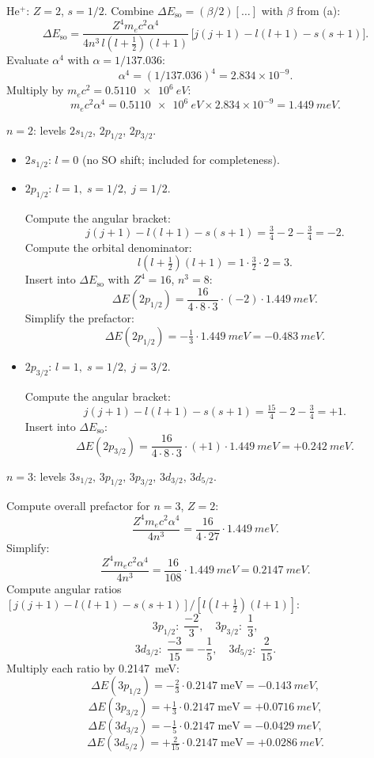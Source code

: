 \documentclass[11pt]{article}
\begin{document}
He$^+$: $Z=2$, $s=1/2$. Combine $\Delta E_{\text{so}}=(\beta/2)[\dots]$ with $\beta$ from (a):
\[
\Delta E_\text{so} = \frac{Z^4 m_e c^2\alpha^4}{4 n^3\,l(l+\tfrac12)(l+1)}\,\bigl[j(j+1)-l(l+1)-s(s+1)\bigr].
\]
Evaluate $\alpha^4$ with $\alpha=1/137.036$:
\[
\alpha^4 = (1/137.036)^4 = 2.834\times 10^{-9}.
\]
Multiply by $m_ec^2=\SI{0.5110e6}{eV}$:
\[
m_e c^2\alpha^4 = \SI{0.5110e6}{eV}\times 2.834\times 10^{-9} = \SI{1.449}{meV}.
\]

\medskip
$n=2$: levels $2s_{1/2}$, $2p_{1/2}$, $2p_{3/2}$.
\begin{itemize}
\item $2s_{1/2}$: $l=0$ (no SO shift; included for completeness).
\item $2p_{1/2}$: $l=1,\;s=1/2,\;j=1/2$.

Compute the angular bracket:
\[
j(j+1)-l(l+1)-s(s+1) = \tfrac{3}{4}-2-\tfrac{3}{4} = -2.
\]
Compute the orbital denominator:
\[
l(l+\tfrac12)(l+1) = 1\cdot\tfrac32\cdot 2 = 3.
\]
Insert into $\Delta E_\text{so}$ with $Z^4=16$, $n^3=8$:
\[
\Delta E(2p_{1/2}) = \frac{16}{4\cdot 8\cdot 3}\cdot(-2)\cdot\SI{1.449}{meV}.
\]
Simplify the prefactor:
\[
\Delta E(2p_{1/2}) = -\tfrac{1}{3}\cdot\SI{1.449}{meV} = -\SI{0.483}{meV}.
\]
\item $2p_{3/2}$: $l=1,\;s=1/2,\;j=3/2$.

Compute the angular bracket:
\[
j(j+1)-l(l+1)-s(s+1) = \tfrac{15}{4}-2-\tfrac{3}{4} = +1.
\]
Insert into $\Delta E_\text{so}$:
\[
\Delta E(2p_{3/2}) = \frac{16}{4\cdot 8\cdot 3}\cdot(+1)\cdot\SI{1.449}{meV} = +\SI{0.242}{meV}.
\]
\end{itemize}

$n=3$: levels $3s_{1/2},\,3p_{1/2},\,3p_{3/2},\,3d_{3/2},\,3d_{5/2}$.

Compute overall prefactor for $n=3$, $Z=2$:
\[
\frac{Z^4 m_ec^2\alpha^4}{4n^3} = \frac{16}{4\cdot 27}\cdot\SI{1.449}{meV}.
\]
Simplify:
\[
\frac{Z^4 m_ec^2\alpha^4}{4n^3} = \frac{16}{108}\cdot\SI{1.449}{meV} = \SI{0.2147}{meV}.
\]
Compute angular ratios $[j(j+1)-l(l+1)-s(s+1)]/[l(l+\tfrac12)(l+1)]$:
\[
3p_{1/2}:\;\frac{-2}{3},\quad 3p_{3/2}:\;\frac{1}{3},
\]
\[
3d_{3/2}:\;\frac{-3}{15}=-\frac{1}{5},\quad 3d_{5/2}:\;\frac{2}{15}.
\]
Multiply each ratio by \SI{0.2147}{meV}:
\[
\Delta E(3p_{1/2}) = -\tfrac{2}{3}\cdot 0.2147\;\text{meV} = -\SI{0.143}{meV},
\]
\[
\Delta E(3p_{3/2}) = +\tfrac{1}{3}\cdot 0.2147\;\text{meV} = +\SI{0.0716}{meV},
\]
\[
\Delta E(3d_{3/2}) = -\tfrac{1}{5}\cdot 0.2147\;\text{meV} = -\SI{0.0429}{meV},
\]
\[
\Delta E(3d_{5/2}) = +\tfrac{2}{15}\cdot 0.2147\;\text{meV} = +\SI{0.0286}{meV}.
\]
\end{document}
